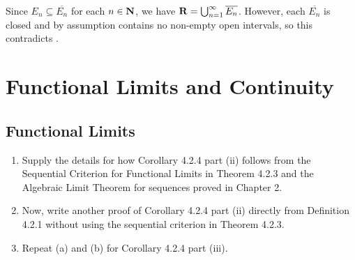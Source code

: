 \documentclass{lew98_solutions}
\begin{document}
\begin{solution}
    Since \( E_n \subseteq \overline{E_n} \) for each \( n \in \mathbf{N} \), we have \( \mathbf{R} = \bigcup_{n=1}^{\infty} \overline{E_n} \). However, each \( \overline{E_n} \) is closed and by assumption contains no non-empty open intervals, so this contradicts .
\end{solution}

\chapter{Functional Limits and Continuity}
\label{chap:4}

\setcounter{section}{1}
\section{Functional Limits}
\label{sec:4.2}

\begin{exercise}
\label{ex:4.2.1}
    \begin{enumerate}
        \item Supply the details for how Corollary 4.2.4 part (ii) follows from the Sequential Criterion for Functional Limits in Theorem 4.2.3 and the Algebraic Limit Theorem for sequences proved in Chapter 2.

        \item Now, write another proof of Corollary 4.2.4 part (ii) directly from Definition 4.2.1 without using the sequential criterion in Theorem 4.2.3.

        \item Repeat (a) and (b) for Corollary 4.2.4 part (iii).
    \end{enumerate}
\end{exercise}
\end{document}
